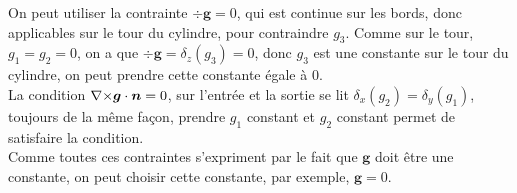 On peut utiliser la contrainte $\div\bm{g}=0$, qui est continue sur les bords, donc applicables sur le tour du cylindre, pour contraindre $g_3$. Comme sur le tour, $g_1=g_2=0$, on a que $\div\bm{g}=\delta_z(g_3)=0$, donc $g_3$ est une constante sur le tour du cylindre, on peut prendre cette constante égale à 0.\\

La condition ${\nabla\times}\bm{g}\cdot\bm{n}=0$, sur l'entrée et la sortie se lit $\delta_x(g_2)=\delta_y(g_1)$, toujours de la même façon, prendre $g_1$ constant et $g_2$ constant permet de satisfaire la condition.\\

Comme toutes ces contraintes s'expriment par le fait que $\bm{g}$ doit être une constante, on peut choisir cette constante, par exemple, $\bm{g}=0$.




